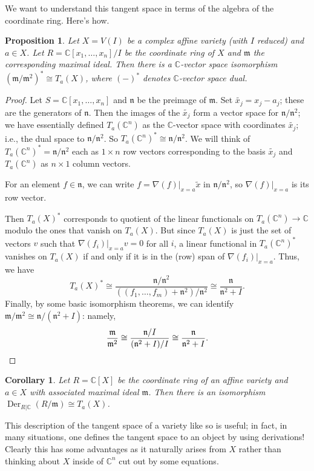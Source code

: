 \documentclass{amsart}[12pt]
\def\Der{\operatorname{Der}}
\newcommand{\C}{\mathbb{C}}
\newcommand{\fm}{{\mathfrak m}}
\newcommand{\fn}{{\mathfrak n}}
\numberwithin{equation}{section}
\theoremstyle{plain} %
\newtheorem{cor}[equation]{Corollary}
\newtheorem{prop}[equation]{Proposition}
\theoremstyle{definition}
\theoremstyle{remark}
\begin{document}
We want to understand this tangent space in terms of the algebra of the coordinate ring. Here's how.

\begin{prop}
Let $X = V(I)$ be a complex affine variety (with $I$ reduced) and $a\in X$. Let $R=\C[x_1,\dots,x_n]/I$ be the coordinate ring of $X$ and $\fm$ the corresponding maximal ideal. Then there is a $\C$-vector space isomorphism $(\fm/\fm^2)^*\cong T_a(X)$, where $(-)^*$ denotes $\C$-vector space dual.
\end{prop}
\begin{proof} Let $S=\C[x_1,\dots,x_n]$ and $\fn$ be the preimage of $\fm$. Set $\widetilde{x_j} = x_j-a_j$; these are the generators of $\fn$. 
Then  the images of the $\widetilde{x_j}$ form a vector space for $\fn/\fn^2$; we have essentially defined $T_a(\C^n)$ as the $\C$-vector space with coordinates $\widetilde{x_j}$; i.e., the dual space to $\fn/\fn^2$. So $T_a(\C^n)^*\cong \fn/\fn^2$. We will think of $T_a(\C^n)^*= \fn/\fn^2$ each as $1\times n$ row vectors corresponding to the basis $\widetilde{x_j}$ and $T_a(\C^n)$ as $n \times 1$ column vectors.

For an element $f\in \fn$, we can write $f=\nabla(f)|_{x=a}  \widetilde{x}$ in $\fn / \fn^2$, so $\nabla(f)|_{x=a}$ is its row vector.

Then $T_a(X)^*$ corresponds to quotient of the linear functionals on $T_a(\C^n)\to \C$ modulo the ones that vanish on $T_a(X)$. But since $T_a(X)$ is just the set of vectors $v$ such that $\nabla(f_i)|_{x=a} v=0$ for all $i$, a linear functional in $T_a(\C^n)^*$ vanishes on $T_a(X)$ if and only if it is in the (row) span of $\nabla(f_i)|_{x=a}$. Thus, we have \[T_a(X)^* \cong \frac{\fn/\fn^2}{((f_1,\dots,f_m)+\fn^2)/\fn^2} \cong \frac{\fn}{\fn^2+I}.\] Finally, by some basic isomorphism theorems, we can identify $\fm/\fm^2 \cong \fn / (\fn^2+I)$: namely,
\[ \frac{\fm}{\fm^2} \cong \frac{\fn/I}{(\fn^2 + I)/I} \cong \frac{\fn}{\fn^2+I}.\qedhere\]
\end{proof}


\begin{cor} Let $R=\C[X]$ be the coordinate ring of an affine variety and $a\in X$ with associated maximal ideal $\fm$. Then there is an isomorphism $\Der_{R|\C}(R/\fm) \cong T_a(X)$.
\end{cor}

This description of the tangent space of a variety like so is useful; in fact, in many situations, one defines the tangent space to an object by using derivations! Clearly this has some advantages as it naturally arises from $X$ rather than thinking about $X$ inside of $\C^n$ cut out by some equations.
\end{document}
